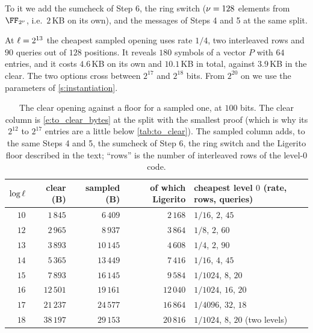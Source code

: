 \documentclass[11pt,letterpaper,usenames,dvipsnames]{article}
\begin{document}
To it we add the sumcheck of Step 6, the ring switch ($\nu=128$ elements from $\comfield$, i.e.\ $2$\,KB on its own), and the messages of Steps 4 and 5 at the same split.

At $\ell=2^{13}$ the cheapest sampled opening uses rate $1/4$, two interleaved rows and $90$ queries out of $128$ positions. It reveals $180$ symbols of a vector $P$ with $64$ entries, and it costs $4.6$\,KB on its own and $10.1$\,KB in total, against $3.9$\,KB in the clear. The two options cross between $2^{17}$ and $2^{18}$ bits. From $2^{20}$ on we use the parameters of \cref{s:instantiation}.

\begin{table}[h]
\centering
\small
\begin{tabular}{@{}rrrrl@{}}
\toprule
$\log\ell$ & clear (B) & sampled (B) & of which Ligerito & cheapest level $0$ (rate, rows, queries) \\
\midrule
$10$ & $1\,845$ & $6\,409$ & $2\,168$ & $1/16$, $2$, $45$ \\
$12$ & $2\,965$ & $8\,937$ & $3\,864$ & $1/8$, $2$, $60$ \\
$13$ & $3\,893$ & $10\,145$ & $4\,608$ & $1/4$, $2$, $90$ \\
$14$ & $5\,365$ & $13\,449$ & $7\,416$ & $1/16$, $4$, $45$ \\
$15$ & $7\,893$ & $16\,145$ & $9\,584$ & $1/1024$, $8$, $20$ \\
$16$ & $12\,501$ & $19\,161$ & $12\,040$ & $1/1024$, $16$, $20$ \\
$17$ & $21\,237$ & $24\,577$ & $16\,864$ & $1/4096$, $32$, $18$ \\
$18$ & $38\,197$ & $29\,153$ & $20\,816$ & $1/1024$, $8$, $20$ (two levels) \\
\bottomrule
\end{tabular}
\caption{The clear opening against a floor for a sampled one, at $100$ bits. The clear column is \eqref{e:to_clear_bytes} at the split with the smallest proof (which is why its $2^{12}$ to $2^{17}$ entries are a little below \cref{tab:to_clear}). The sampled column adds, to the same Steps 4 and 5, the sumcheck of Step 6, the ring switch and the Ligerito floor described in the text; ``rows'' is the number of interleaved rows of the level-$0$ code.}
\label{tab:to_clear_sampled}
\end{table}
\end{document}
